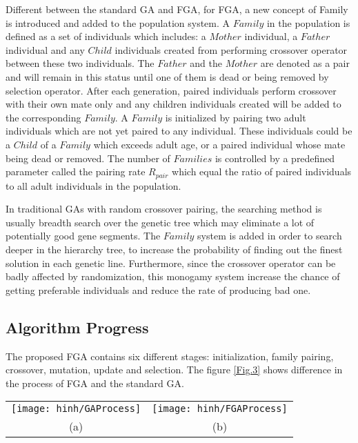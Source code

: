 \documentclass[final]{elsarticle}
\begin{document}
Different between the standard GA and FGA, for FGA, a new concept of Family is introduced and added to the population system. A $ Family $ in the population is defined as a set of individuals which includes: a $ Mother $ individual, a $ Father $ individual and any $ Child $ individuals created from performing crossover operator between these two individuals. The $ Father $ and the $ Mother $ are denoted as a pair and will remain in this status until one of them is dead or being removed by selection operator. After each generation, paired individuals perform crossover with their own mate only and any children individuals created will be added to the corresponding $ Family $. A $ Family $ is initialized by pairing two adult individuals which are not yet paired to any individual. These individuals could be a $ Child $ of a $ Family $ which exceeds adult age, or a paired individual whose mate being dead or removed. The number of $ Families $ is controlled by a predefined parameter called the pairing rate $R_{pair}$ which equal the ratio of paired individuals to all adult individuals in the population.

In traditional GAs with random crossover pairing, the searching method is usually breadth search over the genetic tree which may eliminate a lot of potentially good gene segments. The $ Family $ system is added in order to search deeper in the hierarchy tree, to increase the probability of finding out the finest solution in each genetic line. Furthermore, since the crossover operator can be badly affected by randomization, this monogamy system increase the chance of getting preferable individuals and reduce the rate of producing bad one. 


\subsection{Algorithm Progress}

The proposed FGA contains six different stages: initialization, family pairing, crossover, mutation, update and selection. The figure \ref{Fig.3} shows difference in the process of FGA and the standard GA.
\begin{figure*}[h]
	\begin{tabular}{cc}
		\texttt{[image: hinh/GAProcess]}&\texttt{[image: hinh/FGAProcess]}\\
		(a)  &(b) \\
	\end{tabular}
	\centering
	\caption{The algorithm process of GA (a) and FGA (b)
	}
	\label{Fig.3}       %
\end{figure*}
\end{document}
